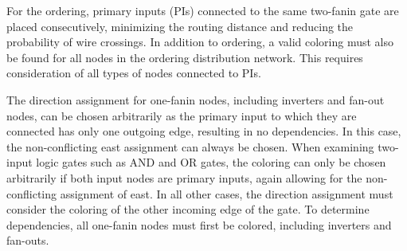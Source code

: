 For the ordering, primary inputs (PIs) connected to the same two-fanin gate are placed consecutively, minimizing the routing distance and reducing the probability of wire crossings. In addition to ordering, a valid coloring must also be found for all nodes in the ordering distribution network. This requires consideration of all types of nodes connected to PIs.

The direction assignment for one-fanin nodes, including inverters and fan-out nodes, can be chosen arbitrarily as the primary input to which they are connected has only one outgoing edge, resulting in no dependencies. In this case, the non-conflicting east assignment can always be chosen. When examining two-input logic gates such as AND and OR gates, the coloring can only be chosen arbitrarily if both input nodes are primary inputs, again allowing for the non-conflicting assignment of east. In all other cases, the direction assignment must consider the coloring of the other incoming edge of the gate. To determine dependencies, all one-fanin nodes must first be colored, including inverters and fan-outs.

